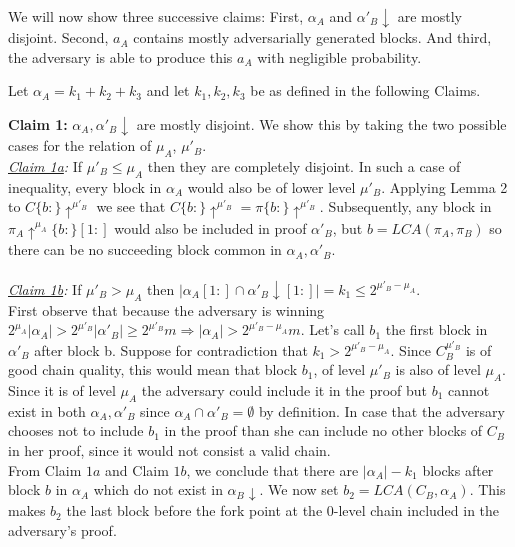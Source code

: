 We will now show three successive claims: First, $\alpha_A$ and $\alpha'_B \downarrow$ are mostly disjoint. Second, $a_A$ contains mostly adversarially generated blocks. And third, the adversary is able to produce this $a_A$ with negligible probability.

Let $\alpha_A = k_1 + k_2 + k_3$ and let $k_1, k_2, k_3$ be as defined in the following Claims.

\textbf{Claim 1:} $\alpha_A, \alpha'_B\downarrow$ are mostly disjoint. We show this by taking the two possible cases for the relation of $\mu_A$, $\mu'_B$.\\
\textit{\underline{Claim 1a}:} If $\mu'_B \leq \mu_A$ then they are completely disjoint. In such a case of inequality, every block in $\alpha_A$ would also be of lower level $\mu'_B$. Applying Lemma 2 to $C\{b:\}\uparrow^{\mu'_B}$  we see that $C\{b:\}\uparrow^{\mu'_B} = \pi\{b:\}\uparrow^{\mu'_B}$. Subsequently, any block in $\pi_A\uparrow^{\mu_A}\{b:\}[1:]$ would also be included in proof $\alpha'_B$, but $b=LCA(\pi_A, \pi_B)$ so there can be no succeeding block common in $\alpha_A, \alpha'_B$. \\
\\
\textit{\underline{Claim 1b}:} If  $\mu'_B > \mu_A$ then $\vert \alpha_A[1:] \cap \alpha'_B\downarrow[1:] \vert = k_1 \leq 2^{\mu'_B - \mu_A}$.\\
First observe that because the adversary is winning $2^{\mu_A} \vert \alpha_A \vert > 2^{\mu'_B} \vert \alpha'_B \vert \geq 2^{\mu'_B} m \Rightarrow \vert \alpha_A \vert > 2^{\mu'_B - \mu_A}m$.
Let's call $b_1$ the first block in $\alpha'_B$ after block b.
Suppose for contradiction that $k_1 > 2^{\mu'_B - \mu_A}$.  Since $C_B^{\mu'_B}$ is of good chain quality, this would mean that block $b_1$, of level $\mu'_B$ is also of level $\mu_A$. Since it is of level $\mu_A$ the adversary could include it in the proof but $b_1$ cannot exist in both $\alpha_A, \alpha'_B$ since $\alpha_A \cap \alpha'_B = \emptyset$ by definition. In case that the adversary chooses not to include $b_1$ in the proof than she can include no other blocks of $C_B$ in her proof, since it would not consist a valid chain.  \\


From Claim $1a$ and Claim $1b$, we conclude that there are $\vert \alpha_A \vert - k_1$ blocks after block $b$ in $\alpha_A$ which do not exist in $\alpha_B\downarrow$. We now set $b_2 = LCA(C_B, \alpha_A)$. This makes $b_2$ the last block before the fork point at the 0-level chain included in the adversary's proof.\\

